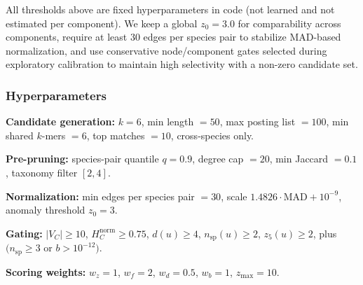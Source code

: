 \documentclass[11pt]{article}
\begin{document}
All thresholds above are fixed hyperparameters in code (not learned and not estimated per component). We keep a global $z_0=3.0$ for comparability across components, require at least 30 edges per species pair to stabilize MAD-based normalization, and use conservative node/component gates selected during exploratory calibration to maintain high selectivity with a non-zero candidate set.
\subsubsection*{Hyperparameters}

\textbf{Candidate generation:}
$k=6$, min length $=50$, max posting list $=100$, min shared $k$-mers $=6$, top matches $=10$, cross-species only.

\textbf{Pre-pruning:}
species-pair quantile $q=0.9$, degree cap $=20$, min Jaccard $=0.1$, taxonomy filter $[2,4]$.

\textbf{Normalization:}
min edges per species pair $=30$, scale $1.4826\cdot \mathrm{MAD} + 10^{-9}$, anomaly threshold $z_0=3$.

\textbf{Gating:}
$|V_C|\ge10$, $H_C^{\mathrm{norm}}\ge0.75$, $d(u)\ge4$, $n_{\mathrm{sp}}(u)\ge2$, $z_5(u)\ge2$, plus $(n_{\mathrm{sp}}\ge3$ or $b>10^{-12})$.

\textbf{Scoring weights:}
$w_z=1$, $w_f=2$, $w_d=0.5$, $w_b=1$, $z_{\max}=10$.
\end{document}

